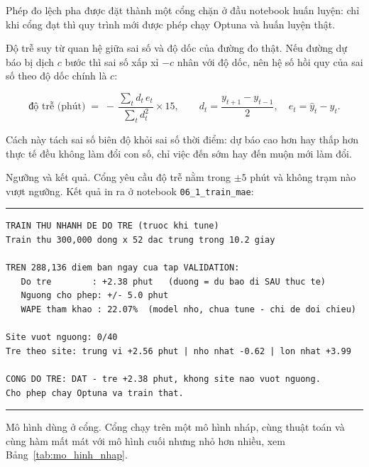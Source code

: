 \documentclass[12pt, a4paper]{report}
\begin{document}
Phép đo lệch pha được đặt thành một cổng chặn ở đầu notebook huấn luyện: chỉ khi cổng đạt
thì quy trình mới được phép chạy Optuna và huấn luyện thật.

Độ trễ suy từ quan hệ giữa sai số và độ dốc của đường đo thật. Nếu đường dự báo bị dịch
$c$ bước thì sai số xấp xỉ $-c$ nhân với độ dốc, nên hệ số hồi quy của sai số theo độ dốc
chính là $c$:

\begin{equation}
\text{độ trễ (phút)} \;=\; -\,\frac{\sum_t d_t \, e_t}{\sum_t d_t^{2}} \times 15,
\qquad
d_t = \frac{y_{t+1} - y_{t-1}}{2}, \quad e_t = \hat{y}_t - y_t .
\end{equation}

Cách này tách sai số biên độ khỏi sai số thời điểm: dự báo cao hơn hay thấp hơn thực tế
đều không làm đổi con số, chỉ việc đến sớm hay đến muộn mới làm đổi.

Ngưỡng và kết quả. Cổng yêu cầu độ trễ nằm trong $\pm 5$ phút và không trạm nào vượt
ngưỡng. Kết quả in ra ở notebook \texttt{06\_1\_train\_mae}:

\begingroup
\par\vspace{6pt}\hrule\vspace{4pt}
\small\renewcommand{\baselinestretch}{1.0}\selectfont
\begin{verbatim}
TRAIN THU NHANH DE DO TRE (truoc khi tune)
Train thu 300,000 dong x 52 dac trung trong 10.2 giay

TREN 288,136 diem ban ngay cua tap VALIDATION:
   Do tre        : +2.38 phut   (duong = du bao di SAU thuc te)
   Nguong cho phep: +/- 5.0 phut
   WAPE tham khao : 22.07%  (model nho, chua tune - chi de doi chieu)

Site vuot nguong: 0/40
Tre theo site: trung vi +2.56 phut | nho nhat -0.62 | lon nhat +3.99

CONG DO TRE: DAT - tre +2.38 phut, khong site nao vuot nguong.
Cho phep chay Optuna va train that.
\end{verbatim}
\vspace{2pt}\hrule\par\vspace{6pt}
\endgroup

Mô hình dùng ở cổng. Cổng chạy trên một mô hình nháp, cùng thuật toán và cùng hàm
mất mát với mô hình cuối nhưng nhỏ hơn nhiều, xem Bảng~\ref{tab:mo_hinh_nhap}.
\end{document}
